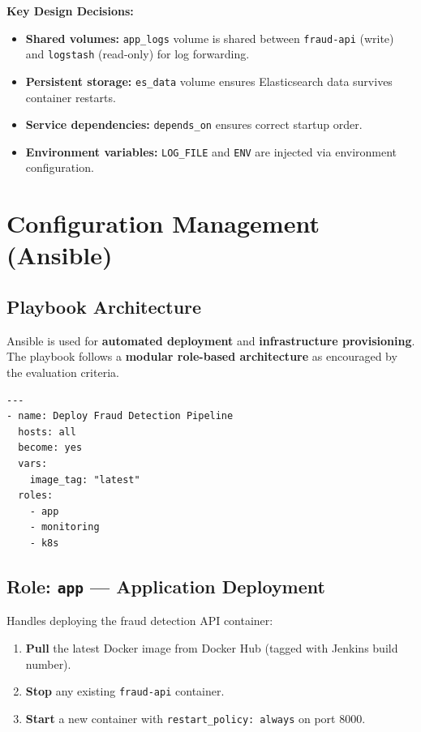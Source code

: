 \documentclass[12pt,a4paper]{article}
\begin{document}
\textbf{Key Design Decisions:}
\begin{itemize}
    \item \textbf{Shared volumes:} \texttt{app\_logs} volume is shared between \texttt{fraud-api} (write) and \texttt{logstash} (read-only) for log forwarding.
    \item \textbf{Persistent storage:} \texttt{es\_data} volume ensures Elasticsearch data survives container restarts.
    \item \textbf{Service dependencies:} \texttt{depends\_on} ensures correct startup order.
    \item \textbf{Environment variables:} \texttt{LOG\_FILE} and \texttt{ENV} are injected via environment configuration.
\end{itemize}

\section{Configuration Management (Ansible)}

\subsection{Playbook Architecture}

Ansible is used for \textbf{automated deployment} and \textbf{infrastructure provisioning}. The playbook follows a \textbf{modular role-based architecture} as encouraged by the evaluation criteria.

\begin{lstlisting}[language={},caption={site.yml --- Main Playbook}]
---
- name: Deploy Fraud Detection Pipeline
  hosts: all
  become: yes
  vars:
    image_tag: "latest"
  roles:
    - app
    - monitoring
    - k8s
\end{lstlisting}

\subsection{Role: \texttt{app} --- Application Deployment}

Handles deploying the fraud detection API container:

\begin{enumerate}
    \item \textbf{Pull} the latest Docker image from Docker Hub (tagged with Jenkins build number).
    \item \textbf{Stop} any existing \texttt{fraud-api} container.
    \item \textbf{Start} a new container with \texttt{restart\_policy: always} on port 8000.
\end{enumerate}
\end{document}
